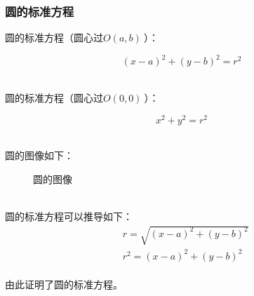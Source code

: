 \documentclass[UTF8]{ctexart}
\begin{document}
\subsubsection{圆的标准方程}
    圆的标准方程（圆心过$O(a,b)~$）：
    \begin{large}
        \begin{equation*}
            (x-a)^2+(y-b)^2=r^2
        \end{equation*}
    \end{large}\\
    圆的标准方程（圆心过$O(0,0)~$）：
    \begin{large}
        \begin{equation*}
            x^2+y^2=r^2
        \end{equation*}
    \end{large}\\
    圆的图像如下：
    \begin{figure}[h!]
        \begin{center}
            \caption{圆的图像}
        \end{center}
    \end{figure}\\
    圆的标准方程可以推导如下：
    \setcounter{equation}{0}
    \begin{align}
        &r=\sqrt{(x-a)^2+(y-b)^2}\\[3mm]
        &r^2=(x-a)^2+(y-b)^2
    \end{align}\\
    由此证明了圆的标准方程。\\

\newpage
\end{document}
